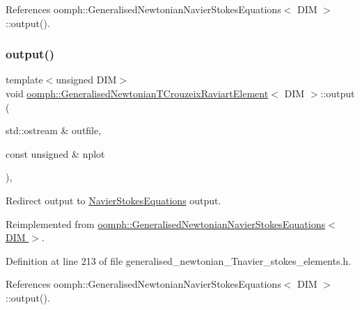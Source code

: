 References oomph\+::\+Generalised\+Newtonian\+Navier\+Stokes\+Equations$<$ D\+I\+M $>$\+::output().

\mbox{\label{classoomph_1_1GeneralisedNewtonianTCrouzeixRaviartElement_a56bdad45189809ed1a288727e63fdb7e}} 
\subsubsection{\texorpdfstring{output()}{output()}\hspace{0.1cm}{\footnotesize\ttfamily [2/4]}}
{\footnotesize\ttfamily template$<$unsigned D\+IM$>$ \\
void \hyperlink{classoomph_1_1GeneralisedNewtonianTCrouzeixRaviartElement}{oomph\+::\+Generalised\+Newtonian\+T\+Crouzeix\+Raviart\+Element}$<$ D\+IM $>$\+::output (\begin{DoxyParamCaption}\item[{std\+::ostream \&}]{outfile,  }\item[{const unsigned \&}]{nplot }\end{DoxyParamCaption})\hspace{0.3cm}{\ttfamily [inline]}, {\ttfamily [virtual]}}



Redirect output to \hyperlink{classoomph_1_1NavierStokesEquations}{Navier\+Stokes\+Equations} output. 



Reimplemented from \hyperlink{classoomph_1_1GeneralisedNewtonianNavierStokesEquations_aadb72645b2396e206fc7765114364095}{oomph\+::\+Generalised\+Newtonian\+Navier\+Stokes\+Equations$<$ D\+I\+M $>$}.



Definition at line 213 of file generalised\+\_\+newtonian\+\_\+\+Tnavier\+\_\+stokes\+\_\+elements.\+h.



References oomph\+::\+Generalised\+Newtonian\+Navier\+Stokes\+Equations$<$ D\+I\+M $>$\+::output().

\mbox{\label{classoomph_1_1GeneralisedNewtonianTCrouzeixRaviartElement_a3147cc62be2891996cf4e11fe8e5be79}} 
